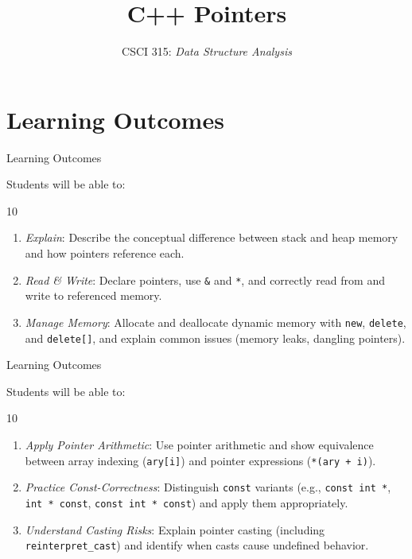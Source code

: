 \documentclass[14pt,aspectratio=1610]{beamer}
\title{\Huge{}{\ttfamily\bfseries C++} Pointers}
\subtitle{CSCI 315: \textit{Data Structure Analysis}}
\institute{Charleston Southern University}
\begin{document}
\begin{frame}
  \titlepage{}
\end{frame}

\section*{Learning Outcomes}

\begin{frame}{Learning Outcomes}

Students will be able to:
\begin{overlayarea}{\linewidth}{10\baselineskip}
\begin{enumerate}
  \item \emph{Explain}: Describe the conceptual difference between stack and heap memory and how pointers reference each.
  \item \emph{Read \& Write}: Declare pointers, use \lstinline{&} and \lstinline{*}, and correctly read from and write to referenced memory.
  \item \emph{Manage Memory}: Allocate and deallocate dynamic memory with \lstinline{new}, \lstinline{delete}, and \lstinline{delete[]}, and explain common issues (memory leaks, dangling pointers).
\end{enumerate}
\end{overlayarea}
\end{frame}

\begin{frame}{Learning Outcomes}

Students will be able to:
\begin{overlayarea}{\linewidth}{10\baselineskip}
\begin{enumerate}\addtocounter{enumi}{3}
  \item \emph{Apply Pointer Arithmetic}: Use pointer arithmetic and show equivalence between array indexing (\lstinline{ary[i]}) and pointer expressions (\lstinline{*(ary + i)}).
  \item \emph{Practice Const-Correctness}: Distinguish \lstinline{const} variants (e.g., \lstinline{const int *}, \lstinline{int * const}, \lstinline{const int * const}) and apply them appropriately.
  \item \emph{Understand Casting Risks}: Explain pointer casting (including \lstinline{reinterpret_cast}) and identify when casts cause undefined behavior.
\end{enumerate}
\end{overlayarea}
\end{frame}
\end{document}
